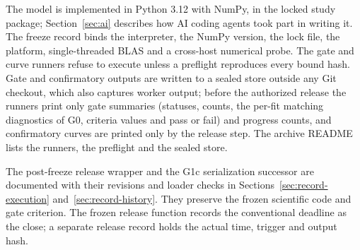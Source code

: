 The model is implemented in Python 3.12 with NumPy, in the locked study package; Section~\ref{sec:ai} describes how AI coding agents took part in writing it. The freeze record binds the interpreter, the NumPy version, the lock file, the platform, single-threaded BLAS and a cross-host numerical probe. The gate and curve runners refuse to execute unless a preflight reproduces every bound hash. Gate and confirmatory outputs are written to a sealed store outside any Git checkout, which also captures worker output; before the authorized release the runners print only gate summaries (statuses, counts, the per-fit matching diagnostics of G0, criteria values and pass or fail) and progress counts, and confirmatory curves are printed only by the release step. The archive README lists the runners, the preflight and the sealed store.

The post-freeze release wrapper and the G1c serialization successor are documented with their revisions and loader checks in Sections~\ref{sec:record-execution} and~\ref{sec:record-history}. They preserve the frozen scientific code and gate criterion. The frozen release function records the conventional deadline as the close; a separate release record holds the actual time, trigger and output hash.
